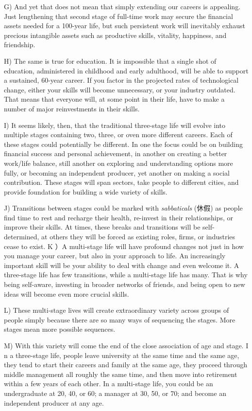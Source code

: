 \documentclass[UTF8,11pt]{ctexart}
\begin{document}
G) And yet that does not mean that simply extending our careers is appealing. Just lengthening that second stage of full-time work may secure the financial assets needed for a 100-year life, but such persistent work will inevitably exhaust precious intangible assets such as productive skills, vitality, happiness, and friendship.


H) The same is true for education. It is impossible that a single shot of education, administered in childhood and early adulthood, will be able to support a sustained, 60-year career. If you factor in the projected rates of technological change, either your skills will become unnecessary, or your industry outdated. That means that everyone will, at some point in their life, have to make a number of major reinvestments in their skills.


I) It seems likely, then, that the traditional three-stage life will evolve into multiple stages containing two, three, or oven more different careers. Each of these stages could potentially be different. In one the focus could be on building financial success and personal achievement, in another on creating a better work/life balance, still another on exploring and understanding options more fully, or becoming an independent producer, yet another on making a social contribution. These stages will span sectors, take people to different cities, and provide foundation for building a wide variety of skills.


J) Transitions between stages could be marked with\textit{ sabbaticals} (休假) as people find time to rest and recharge their health, re-invest in their relationships, or improve their skills. At times, these breaks and transitions will be self-determined, at others they will be forced as existing roles, firms, or industries cease to exist. K ）A multi-stage life will have profound changes not just in how you manage your career, but also in your approach to life. An increasingly important skill will be your ability to deal with change and even welcome it. A three-stage life has few transitions, while a multi-stage life has many. That is why being self-aware, investing in broader networks of friends, and being open to new ideas will become even more crucial skills.


L) These multi-stage lives will create extraordinary variety across groups of people simply because there are so many ways of sequencing the stages. More stages mean more possible sequences.


M) With this variety will come the end of the close association of age and stage. I n a three-stage life, people leave university at the same time and the same age, they tend to start their careers and family at the same age, they proceed through middle management all roughly the same time, and then move into retirement within a few years of each other. In a multi-stage life, you could be an undergraduate at 20, 40, or 60; a manager at 30, 50, or 70; and become an independent producer at any age.
\end{document}
